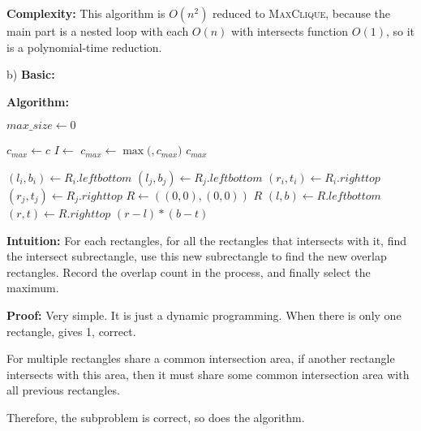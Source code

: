 \documentclass{article}
\newcommand{\Algorithm}{\textbf{Algorithm: }}
\newcommand{\Intuition}{\textbf{Intuition: }}
\newcommand{\Proof}{\textbf{Proof: }}
\newcommand{\Complexity}{\textbf{Complexity: }}
\newcounter{problem}
\begin{document}
\begin{enumerate}[topsep=0pt,parsep=1mm]
\Complexity
This algorithm is $O(n^2)$ reduced to \textsc{MaxClique}, 
because the main part is a nested loop with each $O(n)$ with intersects function $O(1)$, 
so it is a polynomial-time reduction.


b) 
\textbf{Basic:}

\Algorithm

\begin{algorithm}[H]
  \DontPrintSemicolon

   {
    $max\_size\gets 0$\;
     {
      
    }
  }

   {
    $c_{max}\gets c$\;
     {
      $I\gets$\;
       {
        $c_{max}\gets \max($$,c_{max})$
      }
    }
    \Return $c_{max}$
  }

   {
    $(l_i,b_i)\gets R_i.leftbottom$\;
    $(l_j,b_j)\gets R_j.leftbottom$\;
    $(r_i,t_i)\gets R_i.righttop$\;
    $(r_j,t_j)\gets R_j.righttop$\;
     {
      $R\gets((0,0),(0,0))$
    } 
    \Return $R$
  }
   {
    $(l,b)\gets R.leftbottom$\;
    $(r,t)\gets R.righttop$\;
    \Return $(r-l)*(b-t)$
  }
  
\end{algorithm}

\Intuition
For each rectangles, for all the rectangles that intersects with it,
find the intersect subrectangle, use this new subrectangle to find the new overlap rectangles.
Record the overlap count in the process, and finally select the maximum.

\Proof
Very simple. It is just a dynamic programming. When there is only one rectangle, gives 1, correct.

For multiple rectangles share a common intersection area,
if another rectangle intersects with this area,
then it must share some common intersection area with all previous rectangles.

Therefore, the subproblem is correct, so does the algorithm.


\end{enumerate}
\end{document}
